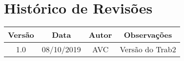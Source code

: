 \chapter*{Histórico de Revisões}

\begin{center}
    \begin{tabular}{|c|c|c|c|}
        \hline
        Versão & Data       & Autor & Observações                                      \\
        \hline
        1.0    & 08/10/2019 & AVC   & Versão do Trab2                                  \\
        \hline
    \end{tabular}
\end{center}
